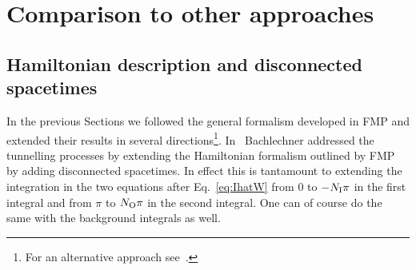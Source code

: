 \documentclass[11pt,a4paper]{article}
\begin{document}
\section{Comparison to other approaches}
\label{sec:Comparison}

\subsection{Hamiltonian description and disconnected spacetimes}

 
In the previous Sections we followed the general formalism developed in FMP and  extended their results in several directions\footnote{For an alternative approach see~\cite{Bachlechner:2018pqk, Bachlechner:2018jmq, Bachlechner:2018rht, UnpublishedBachlechner}.}. In~\cite{Bachlechner:2016mtp} Bachlechner addressed the tunnelling processes by extending the Hamiltonian formalism outlined by FMP by adding disconnected spacetimes. In effect this is tantamount to extending the integration in the two equations after Eq.~\eqref{eq:IhatW} from $0$ to $-N_{\rm I}\pi$ in the first integral and from $\pi$ to $N_{\rm O}\pi$ in the second integral. One can of course do the same with the background integrals as well. 
\end{document}
